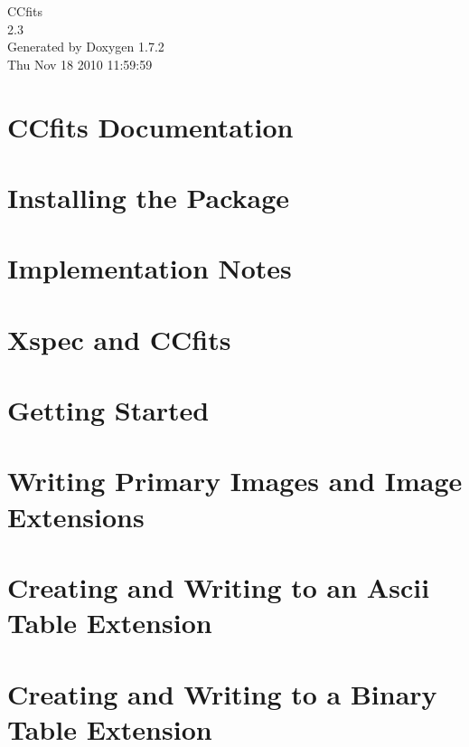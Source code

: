 \documentclass[letterpaper]{article}
\begin{document}
\hypersetup{pageanchor=false}
\begin{titlepage}
\vspace*{7cm}
\begin{center}
{\Large CCfits \\[1ex]\large 2.3 }\\
\vspace*{1cm}
{\large Generated by Doxygen 1.7.2}\\
\vspace*{0.5cm}
{\small Thu Nov 18 2010 11:59:59}\\
\end{center}
\end{titlepage}
\tableofcontents
{}
\hypersetup{pageanchor=true}
\section{CCfits Documentation}
\label{index}\hypertarget{index}{}
\section{Installing the Package}
\label{installation}
\hypertarget{installation}{}

\section{Implementation Notes}
\label{implementation}
\hypertarget{implementation}{}

\section{Xspec and CCfits}
\label{xspec}
\hypertarget{xspec}{}

\section{Getting Started}
\label{cookbook}
\hypertarget{cookbook}{}

\section{Writing Primary Images and Image Extensions}
\label{writeimage}
\hypertarget{writeimage}{}

\section{Creating and Writing to an Ascii Table Extension}
\label{ascii}
\hypertarget{ascii}{}

\section{Creating and Writing to a Binary Table Extension}
\label{binary}
\hypertarget{binary}{}

\end{document}
